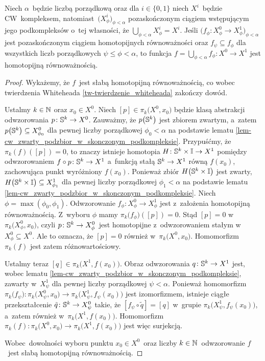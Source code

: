 \begin{lem} %
\label{lem-ciag_wstepujacy_homotopijnych_rownowaznosci_cw_kompleksow}
Niech $\alpha$~będzie liczbą porządkową oraz dla $i\in\{0,1\}$ niech $X^i$~będzie CW~kompleksem, natomiast~$\bigl(X^i_\phi\bigr)_{\phi<\alpha}$ pozaskończonym ciągiem wstępującym jego podkompleksów o~tej własności, że $\bigcup_{\phi<\alpha}X^i_\phi=X^i$. Jeśli $\bigl(f_\phi\colon X^0_\phi\to X^1_\phi\bigr)_{\phi<\alpha}$ jest pozaskończonym ciągiem homotopijnych równoważności oraz $f_{\psi}\subseteq f_{\phi}$ dla wszystkich liczb porządkowych $\psi\leq \phi<\alpha$, to funkcja $f=\bigcup_{\phi<\alpha}f_\phi\colon X^0\to X^1$ jest homotopijną równoważnością.
\end{lem}
\begin{proof}
Wykażemy, że $f$~jest słabą homotopijną równoważnością, co wobec twierdzenia Whiteheada \ref{tw-twierdzenie_whiteheada} zakończy dowód.

Ustalmy $k\in\mN$ oraz $x_0\in X^0$. Niech $[p]\in\pi_k\bigl(X^0,x_0\bigr)$ będzie klasą abstrakcji odwzorowania $p\colon \S^k\to X^0$. Zauważmy, że $p\bigl(\S^k\bigr)$ jest zbiorem zwartym, a~zatem $p\bigl(\S^k\bigr)\subseteq X^0_{\phi_0}$ dla pewnej liczby porządkowej $\phi_0<\alpha$ na podstawie lematu \ref{lem-cw_zwarty_podzbior_w_skonczonym_podkompleksie}. Przypuśćmy, że $\pi_k(f)([p])=0$, to znaczy istnieje homotopia $H\colon \S^k\times \I\to X^1$ pomiędzy odwzorowaniem $f\circ p\colon \S^k\to X^1$ a~funkcją stałą $\S^k\to X^1$ równą $f(x_0)$, zachowująca punkt wyróżniony $f(x_0)$. Ponieważ zbiór $H\bigl(\S^k\times \I\bigr)$ jest zwarty, $H\bigl(\S^k\times \I\bigr)\subseteq X^1_{\phi_1}$ dla pewnej liczby porządkowej $\phi_1<\alpha$ na podstawie lematu \ref{lem-cw_zwarty_podzbior_w_skonczonym_podkompleksie}. Niech $\phi=\max(\phi_0,\phi_1)$. Odwzorowanie $f_\phi\colon X^0_\phi\to X^1_\phi$ jest z~założenia homotopijną równoważnością. Z~wyboru $\phi$ mamy $\pi_k\bigl(f_\phi\bigr)([p])=0$. Stąd $[p]=0$ w~$\pi_k\bigl(X^0_\phi,x_0\bigr)$, czyli $p\colon \S^k\to X^{0}_\phi$~jest homotopijne z~odwzorowaniem stałym w~$X^0_\phi\subseteq X^0$. Ale to oznacza, że $[p]=0$ również w~$\pi_k\bigl(X^0,x_0\bigr)$. Homomorfizm $\pi_k(f)$ jest zatem różnowartościowy.

Ustalmy teraz $[q]\in\pi_k\bigl(X^1,f(x_0)\bigr)$. Obraz odwzorowania $q\colon \S^k\to X^1$ jest, wobec lematu \ref{lem-cw_zwarty_podzbior_w_skonczonym_podkompleksie}, zawarty w~$X^1_\psi$ dla pewnej liczby porządkowej $\psi<\alpha$. Ponieważ homomorfizm $\pi_k\bigl(f_\psi\bigr)\colon \pi_k\bigl(X^0_\psi,x_0\bigr)\to \pi_k\bigl(X^1_\psi,f_\psi(x_0)\bigr)$ jest izomorfizmem, istnieje ciągłe przekształcenie $\tilde{q}\colon \S^k\to X^0_\psi$ takie, że $[f_\psi\circ \tilde{q}]=[q]$ w~grupie $\pi_k\bigl(X^1_\psi,f_\psi(x_0)\bigr)$, a~zatem również w~$\pi_k\bigl(X^1,f(x_0)\bigr)$. Homomorfizm $\pi_k(f)\colon \pi_k\bigl(X^0,x_0\bigr)\to \pi_k\bigl(X^1,f(x_0)\bigr)$ jest więc surjekcją.

Wobec~dowolności wyboru punktu $x_0\in X^0$~oraz liczby $k\in\mN$~odwzorowanie $f$~jest słabą homotopijną równoważnością.
\end{proof}

